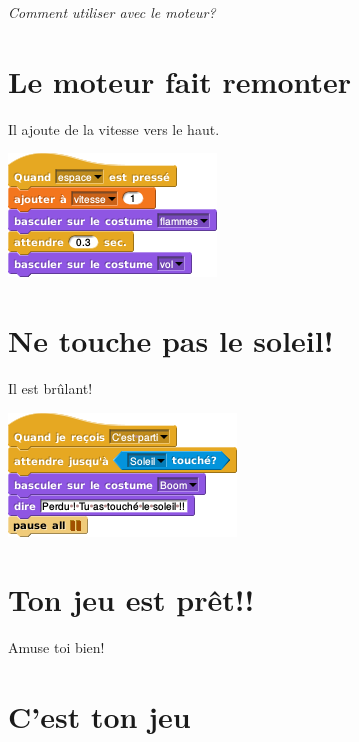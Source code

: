 \documentclass[a7paper,pagesize,DIV=14,10pt]{scrbook}
\begin{document}
\medskip
\centerline{\it Comment utiliser avec le moteur?}


\newpage
\section*{Le moteur fait remonter}
\vspace{-.7\baselineskip}

Il ajoute de la vitesse vers le haut.

\includegraphics[scale=.5]{img/fusee_moteur.png}

\section*{Ne touche pas le soleil!}
\vspace{-.7\baselineskip}
Il est brûlant!

\includegraphics[scale=.5]{img/fusee_fin-soleil.png}

\section*{Ton jeu est prêt!!}
\vspace{-.7\baselineskip}
Amuse toi bien!

\newpage 
\section*{C'est ton jeu}
\vspace{-.5\baselineskip}
\end{document}
